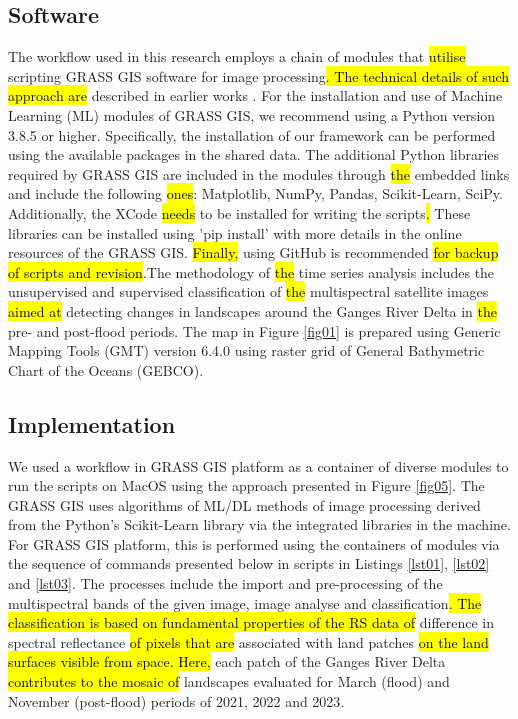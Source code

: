 \documentclass[water,article,submit,pdftex,moreauthors]{Definitions/mdpi}
\begin{document}
\subsection{Software}
The workflow used in this research employs a chain of modules that \hl{utilise} scripting GRASS GIS software \cite{GRASS_GIS_software} for image processing\hl{. The technical details of such approach are }described in earlier works \cite{Lemenkova202323,technologies11020046}. For the installation and use of Machine Learning (ML) modules of GRASS GIS, we recommend using a Python version 3.8.5 or higher. Specifically, the installation of our framework can be performed using the available packages in the shared data. The additional Python libraries required by GRASS GIS are included in the modules through \hl{the} embedded links and include the following \hl{ones}: Matplotlib, NumPy, Pandas, Scikit-Learn, SciPy. Additionally, the XCode \hl{needs} to be installed for writing the scripts\hl{.}  These libraries can be installed using 'pip install' with more details in the online resources of the GRASS GIS.  \hl{Finally, }using GitHub is recommended \hl{for backup of scripts and revision}.The methodology of \hl{the} time series analysis includes the unsupervised and supervised classification of \hl{the} multispectral satellite images \hl{aimed at} detecting changes in landscapes around the Ganges River Delta in \hl{the} pre- and post-flood periods. The map in Figure \ref{fig01} is prepared using Generic Mapping Tools (GMT) version 6.4.0 \cite{Wessel,WesselSmith} using raster grid of General Bathymetric Chart of the Oceans (GEBCO). 

\subsection{Implementation}
We used a workflow in GRASS GIS platform as a container of diverse modules to run the scripts on MacOS using the approach presented in Figure \ref{fig05}. The GRASS GIS uses algorithms of ML/DL methods of image processing derived from the Python's Scikit-Learn library \cite{pedregosa2011scikit} via the integrated libraries in the machine. For GRASS GIS platform, this is performed using the containers of modules via the sequence of commands presented below in scripts in Listings \ref{lst01}, \ref{lst02} and \ref{lst03}. The processes include the import and pre-processing of the multispectral bands of the given image, image analyse and classification\hl{. The classification is based on fundamental properties of the RS data of }difference in spectral reflectance \hl{of pixels that are }associated with land patches \hl{on the land surfaces visible from space. Here, }each\hl{ }patch of the Ganges River Delta \hl{contributes to the mosaic of }landscapes evaluated for March (flood) and November (post-flood) periods of 2021, 2022 and 2023.
\end{document}
